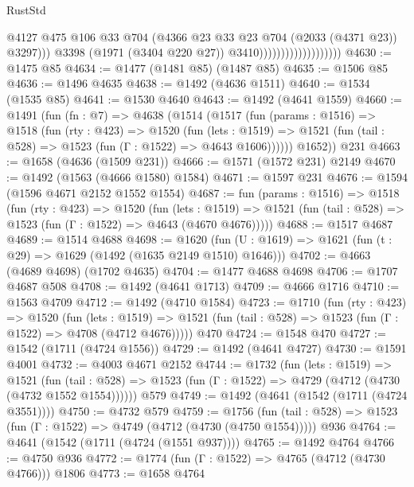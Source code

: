 \begin{lexlean}{RustStd}
\begin{coremodule}
{\begin{coremodule}
{{{{{{{{{{{{{                                              @4127
                                              @475
                                              @106
                                              @33
                                              @704
                                              (@4366 @23 @33 @23 @704 (@2033 (@4371 @23)) @3297)))
                                          @3398
                                          (@1971 (@3404 @220 @27))
                                          @3410)))))))))))))))))))
@4630 := @1475 @85
@4634 := @1477 (@1481 @85) (@1487 @85)
@4635 := @1506 @85
@4636 := @1496 @4635
@4638 := @1492 (@4636 @1511)
@4640 := @1534 (@1535 @85)
@4641 := @1530 @4640
@4643 := @1492 (@4641 @1559)
@4660 := @1491
    (fun (fn : @7) =>
    @4638
      (@1514
        (@1517
          (fun (params : @1516) =>
          @1518
            (fun (rty : @423) =>
            @1520
              (fun (lets : @1519) =>
              @1521 (fun (tail : @528) => @1523 (fun (Γ : @1522) => @4643 @1606))))))
        @1652))
    @231
@4663 := @1658 (@4636 (@1509 @231))
@4666 := @1571 (@1572 @231) @2149
@4670 := @1492 (@1563 (@4666 @1580) @1584)
@4671 := @1597 @231
@4676 := @1594 (@1596 @4671 @2152 @1552 @1554)
@4687 := fun (params : @1516) =>
  @1518
    (fun (rty : @423) =>
    @1520
      (fun (lets : @1519) =>
      @1521 (fun (tail : @528) => @1523 (fun (Γ : @1522) => @4643 (@4670 @4676)))))
@4688 := @1517 @4687
@4689 := @1514 @4688
@4698 := @1620 (fun (U : @1619) => @1621 (fun (t : @29) => @1629 (@1492 (@1635 @2149 @1510) @1646)))
@4702 := @4663 (@4689 @4698) (@1702 @4635)
@4704 := @1477 @4688 @4698
@4706 := @1707 @4687 @508
@4708 := @1492 (@4641 @1713)
@4709 := @4666 @1716
@4710 := @1563 @4709
@4712 := @1492 (@4710 @1584)
@4723 := @1710
    (fun (rty : @423) =>
    @1520
      (fun (lets : @1519) =>
      @1521 (fun (tail : @528) => @1523 (fun (Γ : @1522) => @4708 (@4712 @4676)))))
    @470
@4724 := @1548 @470
@4727 := @1542 (@1711 (@4724 @1556))
@4729 := @1492 (@4641 @4727)
@4730 := @1591 @4001
@4732 := @4003 @4671 @2152
@4744 := @1732
    (fun (lets : @1519) =>
    @1521
      (fun (tail : @528) => @1523 (fun (Γ : @1522) => @4729 (@4712 (@4730 (@4732 @1552 @1554))))))
    @579
@4749 := @1492 (@4641 (@1542 (@1711 (@4724 @3551))))
@4750 := @4732 @579
@4759 := @1756
    (fun (tail : @528) => @1523 (fun (Γ : @1522) => @4749 (@4712 (@4730 (@4750 @1554)))))
    @936
@4764 := @4641 (@1542 (@1711 (@4724 (@1551 @937))))
@4765 := @1492 @4764
@4766 := @4750 @936
@4772 := @1774 (fun (Γ : @1522) => @4765 (@4712 (@4730 @4766))) @1806
@4773 := @1658 @4764
}}}}}}}}}}}}}
\end{coremodule}}
\end{coremodule}
\end{lexlean}
